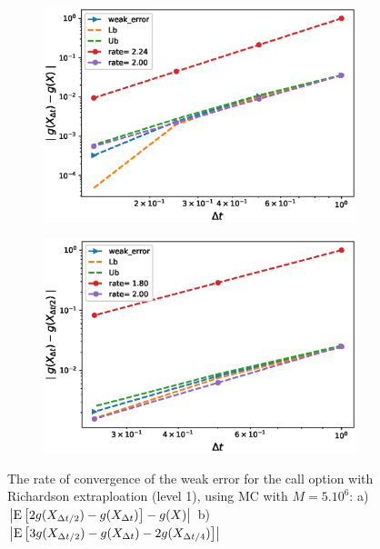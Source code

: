 \documentclass[11pt]{article}
\newcommand{\expt}[1]{\mathrm{E}\left[#1\right]}
\begin{document}
\begin{figure}[h!]
	\centering
	\begin{subfigure}{.4\textwidth}
		\centering
		\includegraphics[width=1\linewidth]{./figures/weak_error_rates_call/Beta_32/with_rich/weak_convergence_order_call_richardson_relative}
		\caption{}
		\label{fig:sub3}
	\end{subfigure}%
	\begin{subfigure}{.4\textwidth}
		\centering
		\includegraphics[width=1\linewidth]{./figures/weak_error_rates_call/Beta_32/with_rich/weak_convergence_order_differences_call_richardson_relative}
		\caption{}
		\label{fig:sub4}
	\end{subfigure}
	
	\caption{The rate of convergence of the weak error for the  call option with Richardson extraploation (level 1), using MC with $M=5.10^6$: a) $\abs{\expt{2 g(X_{\Delta t/2}) -g(X_{\Delta t})}-g(X)}$  b) $\abs{\expt{3 g(X_{\Delta t/2})-g(X_{\Delta t})-2 g(X_{\Delta t/4})}}$}
	\label{fig:Weak_rate_call_with_rich_level1_beta_32}
\end{figure}
\end{document}
